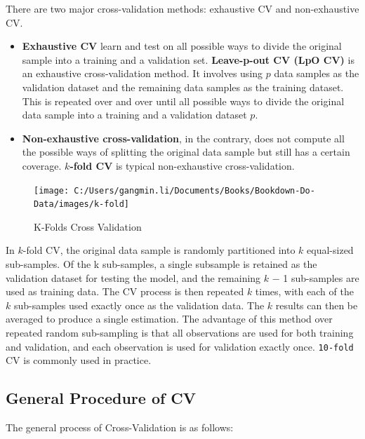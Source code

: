 \documentclass[
]{book}
\begin{document}
There are two major cross-validation methods: exhaustive CV and non-exhaustive CV.

\begin{itemize}
\item
  \textbf{Exhaustive CV} learn and test on all possible ways to divide the original sample into a training and a validation set. \textbf{Leave-p-out CV (LpO CV)} is an exhaustive cross-validation method. It involves using \(p\) data samples as the validation dataset and the remaining data samples as the training dataset. This is repeated over and over until all possible ways to divide the original data sample into a training and a validation dataset \(p\).
\item
  \textbf{Non-exhaustive cross-validation}, in the contrary, does not compute all the possible ways of splitting the original data sample but still has a certain coverage. \textbf{\(k\)-fold CV} is typical non-exhaustive cross-validation.
\end{itemize}

\begin{figure}

{\centering \texttt{[image: C:/Users/gangmin.li/Documents/Books/Bookdown-Do-Data/images/k-fold]} 

}

\caption{K-Folds Cross Validation}\label{fig:k-fold}
\end{figure}

In \(k\)-fold CV, the original data sample is randomly partitioned into \(k\) equal-sized sub-samples. Of the k sub-samples, a single subsample is retained as the validation dataset for testing the model, and the remaining \(k\) − 1 sub-samples are used as training data. The CV process is then repeated \(k\) times, with each of the \(k\) sub-samples used exactly once as the validation data. The \(k\) results can then be averaged to produce a single estimation. The advantage of this method over repeated random sub-sampling is that all observations are used for both training and validation, and each observation is used for validation exactly once. \texttt{10-fold} CV is commonly used in practice.

\hypertarget{general-procedure-of-cv}{%
\subsection*{General Procedure of CV}\label{general-procedure-of-cv}}


The general process of Cross-Validation is as follows:
\end{document}
